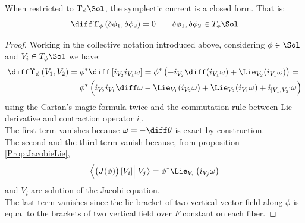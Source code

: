 \documentclass[a4paper,12pt,fleqn]{scrartcl}  %
\begin{document}
\begin{proposition}\label{Prop:CurrentClosed}
	When restricted to $\textrm{T}_\phi \Sol$, the symplectic current is a closed form. That is:
	\begin{displaymath}
		\diff \Upsilon_\phi \left( \delta \phi_1 , \delta \phi_2 \right) = 0 \qquad \delta \phi_1 , \delta \phi_2 \in T_\phi \Sol
	\end{displaymath}
\end{proposition}
\begin{proof}
	Working in the collective notation introduced above, considering $\phi \in \Sol$ and $V_i \in T_\phi \Sol$  we have:
	\begin{align*}
		\diff \Upsilon_\phi \left( V_1 , V_2 \right) &= 
		\phi^\ast \diff \left[ i_{V_2} i_{V_1} \omega \right] = 
		\phi^\ast \left( - i_{V_2} \diff ( i_{V_1} \omega )  + \Lie_{V_2 } ( i_{V_1} \omega ) \right) =	\\
		&= \phi^\ast \left( 
			i_{V_2}i_{V_1} \diff \omega - 
			\Lie_{V_1 } ( i_{V_2} \omega ) +
			\Lie_{V_2 } ( i_{V_1} \omega ) +
			i_{[V_1,V_2]} \omega
		\right)
	\end{align*}
	using the Cartan's magic formula twice and the commutation rule between Lie derivative and contraction operator $i_\cdot$.\\
	The first term vanishes because $\omega= - \diff \theta$ is exact by construction.\\
	The second and the third term vanish because, from proposition \ref{Prop:JacobieLie},
	\begin{displaymath}
		\left\langle \left( J(\phi) \right)[V_i] \right\vert \left. V_j \right\rangle = 
		\phi^\ast \Lie_{V_i} \left( i_{V_j} \omega \right)
	\end{displaymath}
	and $V_i$ are solution of the Jacobi equation.\\
	The last term vanishes since the lie bracket of two vertical vector field along $\phi$ is equal to the brackets of two vertical field over $F$ constant on each fiber.
\end{proof}
\end{document}
